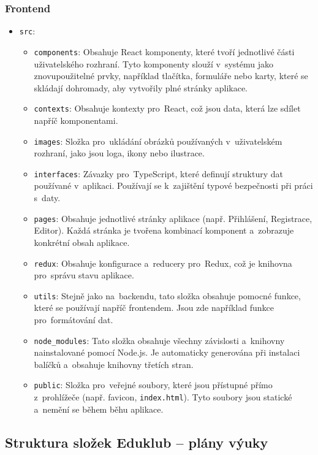 \documentclass[male,czech,api_bc]{kitheses}
\begin{document}
\subsubsection{Frontend}
\begin{itemize}
	\item \texttt{src}:
	\begin{itemize}
		\item \texttt{components}: Obsahuje React komponenty, které tvoří jednotlivé části uživatelského rozhraní. Tyto komponenty slouží v~systému jako znovupoužitelné prvky, například tlačítka, formuláře nebo karty, které se skládají dohromady, aby vytvořily plné stránky aplikace.
		\item \texttt{contexts}: Obsahuje kontexty pro~React, což jsou data, která lze sdílet napříč komponentami.
		\item \texttt{images}: Složka pro~ukládání obrázků používaných v~uživatelském rozhraní, jako jsou loga, ikony nebo ilustrace.
		\item \texttt{interfaces}: Závazky pro~TypeScript, které definují struktury dat používané v~aplikaci. Používají se k~zajištění typové bezpečnosti při práci s~daty.
		\item \texttt{pages}: Obsahuje jednotlivé stránky aplikace (např. Přihlášení, Registrace, Editor). Každá stránka je tvořena kombinací komponent a~zobrazuje konkrétní obsah aplikace.
		\item \texttt{redux}: Obsahuje konfigurace a~reducery pro~Redux, což je knihovna pro~správu stavu aplikace.
		\item \texttt{utils}: Stejně jako na~backendu, tato složka obsahuje pomocné funkce, které se používají napříč frontendem. Jsou zde například funkce pro~formátování dat.
		\item \texttt{node\_modules}: Tato složka obsahuje všechny závislosti a~knihovny nainstalované pomocí Node.js. Je automaticky generována při instalaci balíčků a~obsahuje knihovny třetích stran.
		\item \texttt{public}: Složka pro~veřejné soubory, které jsou přístupné přímo z~prohlížeče (např. favicon, \texttt{index.html}). Tyto soubory jsou statické a~nemění se během běhu aplikace.
	\end{itemize}
\end{itemize}

\subsection{Struktura složek Eduklub – plány výuky}
\end{document}
